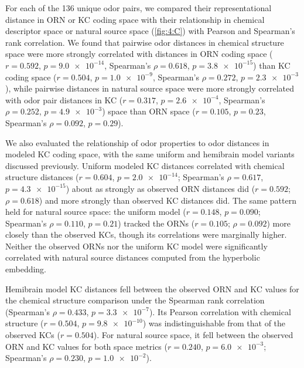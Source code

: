 \documentclass[12pt]{caltech_thesis}
\begin{document}
\begin{refsection}
For each of the 136 unique odor pairs, we compared their representational distance in ORN or KC coding space with their relationship in chemical descriptor space or natural source space (\cref{fig:4:C}) with Pearson and Spearman's rank correlation.
We found that pairwise odor distances in chemical structure space were more strongly correlated with distances in ORN coding space ($r{=}0.592$, $p{=}\num{9.0e-14}$, Spearman's $\rho {=}0.618$, $p{=}\num{3.8e-15}$) than KC coding space ($r{=}0.504$, $p{=}\num{1.0e-9}$, Spearman's $\rho {=}0.272$, $p{=}\num{2.3e-3}$), while pairwise distances in natural source space were more strongly correlated with odor pair distances in KC ($r{=}0.317$, $p{=}\num{2.6e-4}$, Spearman's $\rho {=}0.252$, $p{=}\num{4.9e-3}$) space than ORN space ($r{=}0.105$, $p{=}0.23$, Spearman's $\rho {=}0.092$, $p{=}0.29$). 

We also evaluated the relationship of odor properties to odor distances in modeled KC coding space, with the same uniform and hemibrain model variants discussed previously.
Uniform modeled KC distances correlated with chemical structure distances ($r{=}0.604$, $p{=}\num{2.0e-14}$; Spearman's $\rho {=} 0.617$, $p{=}\num{4.3e-15}$) about as strongly as observed ORN distances did ($r{=}0.592$; $\rho {=} 0.618$) and more strongly than observed KC distances did.
The same pattern held for natural source space: the uniform model ($r{=}0.148$, $p{=}\num{0.090}$; Spearman's $\rho {=} 0.110$, $p{=}\num{0.21}$) tracked the ORNs ($r{=}0.105$; $\rho {=} 0.092$) more closely than the observed KCs, though its correlations were marginally higher.
Neither the observed ORNs nor the uniform KC model were significantly correlated with natural source distances computed from the hyperbolic embedding.

Hemibrain model KC distances fell between the observed ORN and KC values for the chemical structure comparison under the Spearman rank correlation (Spearman's $\rho {=} 0.433$, $p{=}\num{3.3e-7}$).
Its Pearson correlation with chemical structure ($r{=}0.504$, $p{=}\num{9.8e-10}$) was indistinguishable from that of the observed KCs ($r{=}0.504$).
For natural source space, it fell between the observed ORN and KC values for both space metrics ($r{=}0.240$, $p{=}\num{6.0e-3}$; Spearman's $\rho {=} 0.230$, $p{=}\num{1.0e-2}$).


\end{refsection}
\end{document}
